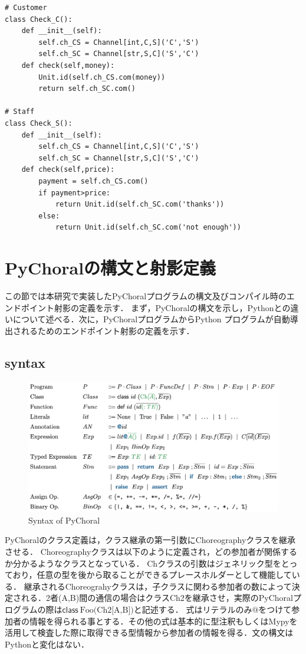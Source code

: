 \documentclass{thesis}
\begin{document}
\begin{lstlisting}[caption=generated Python,label=python]
# Customer
class Check_C():
    def __init__(self):
        self.ch_CS = Channel[int,C,S]('C','S')
        self.ch_SC = Channel[str,S,C]('S','C')
    def check(self,money):
        Unit.id(self.ch_CS.com(money))
        return self.ch_SC.com()

# Staff
class Check_S():
    def __init__(self):
        self.ch_CS = Channel[int,C,S]('C','S')
        self.ch_SC = Channel[str,S,C]('S','C')
    def check(self,price):
        payment = self.ch_CS.com()
        if payment>price:
            return Unit.id(self.ch_SC.com('thanks'))
        else:
            return Unit.id(self.ch_SC.com('not enough'))
\end{lstlisting}
\section{PyChoralの構文と射影定義}
この節では本研究で実装したPyChoralプログラムの構文及びコンパイル時のエンドポイント射影の定義を示す．
まず，PyChoralの構文を示し，Pythonとの違いについて述べる．次に，PyChoralプログラムからPython
プログラムが自動導出されるためのエンドポイント射影の定義を示す．

\subsection{syntax}
\begin{figure}[H]
  \centering
  \includegraphics[scale=0.75]{image/syntax.png}
  \caption{Syntax of PyChoral}
  \label{syntax}
\end{figure}

PyChoralのクラス定義は，クラス継承の第一引数にChoreographyクラスを継承させる．
Choreographyクラスは以下のように定義され，どの参加者が関係するか分かるようなクラスとなっている．
Chクラスの引数はジェネリック型をとっており，任意の型を後から取ることができるプレースホルダーとして機能している．
継承されるChoreograhyクラスは，子クラスに関わる参加者の数によって決定される．2者(A,B)間の通信の場合はクラスCh2を継承させ，実際のPyChoralプログラムの際は$\textsf{class}~\text{Foo(Ch2[A,B])}$と記述する．
式はリテラルのみ$@$をつけて参加者の情報を得られる事とする．その他の式は基本的に型注釈もしくはMypyを活用して検査した際に取得できる型情報から参加者の情報を得る．文の構文はPythonと変化はない．
\end{document}
